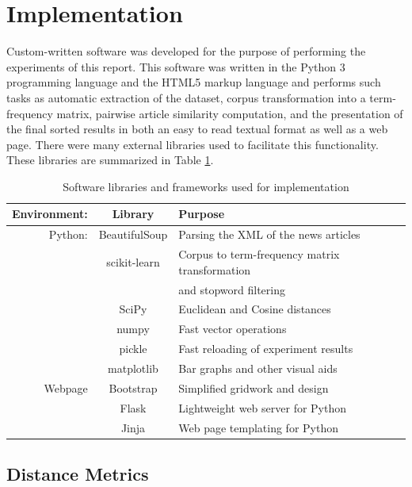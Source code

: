 \documentclass[11pt]{article}
\begin{document}

\section{Implementation} \label{sec:software}

Custom-written software was developed for the purpose of performing the experiments of this report. This software was written in the Python 3 programming language and the HTML5 markup language and performs such tasks as automatic extraction of the dataset, corpus transformation into a term-frequency matrix, pairwise article similarity computation, and the presentation of the final sorted results in both an easy to read textual format as well as a web page.
There were many external libraries used to facilitate this functionality.
These libraries are summarized in Table \ref{tab:libraries}.

\begin{table}[h] \label{tab:libraries}
	\centering
	\begin{tabular}{ r|c|l }
		\hline
		Environment: & Library & Purpose \\ \hline
		Python: & BeautifulSoup & Parsing the XML of the news articles \\
		&	scikit-learn\cite{scikit-learn} & Corpus to term-frequency matrix transformation \\
		& & and stopword filtering \\
		& 	SciPy\cite{scipy} & Euclidean and Cosine distances \\
		&   numpy & Fast vector operations \\
		&  pickle & Fast reloading of experiment results \\
		& matplotlib & Bar graphs and other visual aids \\ \hline
		Webpage & Bootstrap & Simplified gridwork and design \\
		&  Flask  & Lightweight web server for Python \\
		& Jinja & Web page templating for Python \\ \hline
	\end{tabular}
	
	\caption{Software libraries and frameworks used for implementation}
\end{table}

\subsection{Distance Metrics}
\end{document}
